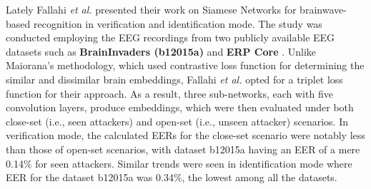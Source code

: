    Lately Fallahi \textit{et al.} \cite{fallahi2023brainnet} presented their work on Siamese Networks for brainwave-based recognition in verification and identification mode. The study was conducted employing the EEG recordings from two publicly available EEG datasets such as \textbf{BrainInvaders (b12015a)} \cite{brainInvaders15a} and \textbf{ERP Core} \cite{erpcore}. Unlike Maiorana's \cite{maiorana2019eeg} methodology, which used contrastive loss function for determining the similar and dissimilar brain embeddings, Fallahi \textit{et al.} opted for a triplet loss function for their approach. As a result, three sub-networks, each with five convolution layers, produce embeddings, which were then evaluated under both close-set (i.e., seen attackers) and open-set (i.e., unseen attacker) scenarios. In verification mode, the calculated EERs for the close-set scenario were notably less than those of open-set scenarios, with dataset b12015a having an EER of a mere 0.14$\%$ for seen attackers. Similar trends were seen in identification mode where EER for the dataset b12015a was 0.34$\%$, the lowest among all the datasets.            

